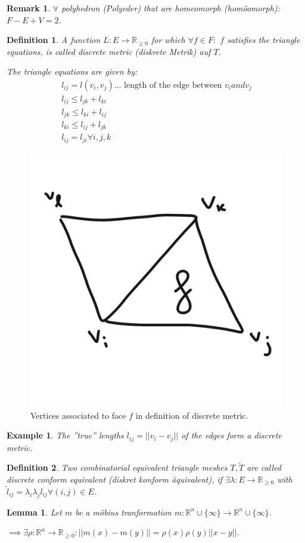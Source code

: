 \documentclass[]{article}
\newtheorem{lemma}{Lemma}
\newtheorem{definition}{Definition}
\newtheorem{example}{Example}
\newtheorem{remark}{Remark}
\begin{document}
\begin{remark}
	$\forall$ polyhedron (Polyeder) that are homeomorph (homöomorph): $F-E+V=2$.
\end{remark}

\begin{definition}
	A function $L:E \rightarrow \mathbb{R}_{\geq 0}$ for which $\forall f \in F:$ $f$ satisfies the triangle equations, is called discrete metric (diskrete Metrik) auf $T$.
	
	The triangle equations are given by:
	\begin{align*}
		l_{ij} = l(v_i, v_j) \text{... length of the edge between } v_i and v_j\\
		l_{ij} \leq l_{jk} + l_{ki}\\
		l_{jk} \leq l_{ki} + l_{ij}\\
		l_{ki} \leq l_{ij} + l_{jk}\\
		l_{ij} = l_{ji} \forall i, j, k
	\end{align*}
\end{definition}

\begin{figure}[h!]
	\centering
	\includegraphics[width=0.3\linewidth]{figures/discrete_metric}
	\caption{Vertices associated to face $f$ in definition of discrete metric.}
	\label{fig:discrete_metric}
\end{figure}	

\begin{example}
	The ''true'' lengths $l_{ij} = ||v_i - v_j||$ of the edges form a discrete metric.
\end{example}

\begin{definition}
	Two combinatorial equivalent triangle meshes $T, \tilde{T}$ are called discrete conform equivalent (diskret konform äquivalent), if $\exists \lambda: E \rightarrow \mathbb{R}_{\geq 0}$ with $\tilde{l}_{ij} = \lambda_i \lambda_j l_{ij} \forall (i,j) \in E$.
\end{definition}

\begin{lemma}
	Let $m$ be a möbius tranformation $m:\mathbb{R}^n \cup \{\infty\} \rightarrow \mathbb{R}^n \cup \{\infty\}$.
	
	$\implies \exists \rho:\mathbb{R}^n \rightarrow \mathbb{R}_{\geq 0}: ||m(x)-m(y)|| = \rho(x) \rho(y) ||x-y||$.
\end{lemma}
\end{document}
